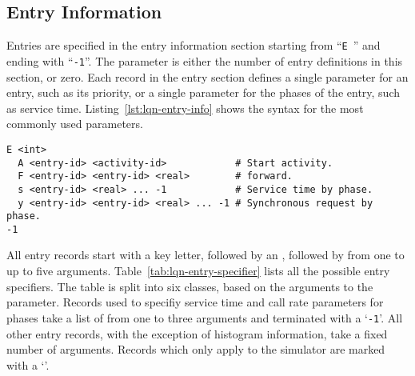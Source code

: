 \subsection{Entry Information}
\label{sec:lqn-entry-information}

Entries are specified in the entry information section starting from
``\texttt{E}~'' and ending with ``\texttt{-1}''.  The  parameter is either
the number of entry definitions in this section, or zero.  Each record in the entry section defines a single
parameter for an entry, such as its priority, or a single parameter for the phases of the entry, such as
service time.  Listing~\ref{lst:lqn-entry-info} shows the syntax for the most commonly used parameters.

\begin{lstlisting}[caption={Entry Information},label=lst:lqn-entry-info,frame=single,firstnumber=1,float]
E <int>
  A <entry-id> <activity-id>            # Start activity.
  F <entry-id> <entry-id> <real>        # forward.
  s <entry-id> <real> ... -1            # Service time by phase.
  y <entry-id> <entry-id> <real> ... -1 # Synchronous request by phase.
-1
\end{lstlisting}

All entry records start with a key letter, followed by an , followed by from one to up
to five arguments.  Table~\ref{tab:lqn-entry-specifier} lists all the possible entry specifiers.  The table
is split into six classes, based on the arguments to the parameter.  Records used to specifiy service time
and call rate parameters for phases take a list of from one to three arguments and terminated with a
`\texttt{-1}'.  All other entry records, with the exception of histogram information, take a fixed number of
arguments.   Records which only apply to the simulator are marked with a `\dag'.

